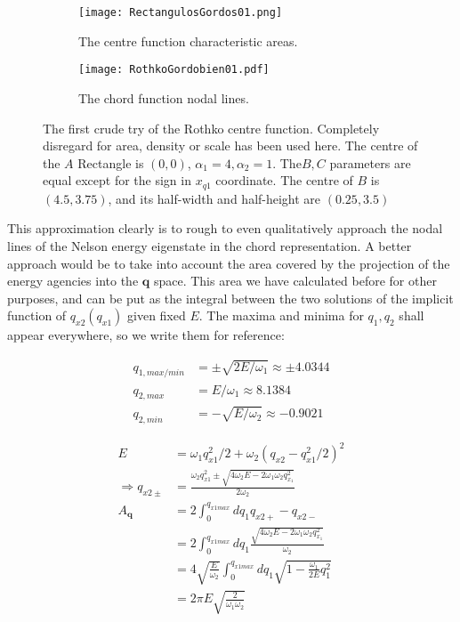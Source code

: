 \documentclass[a4paper,12pt]{article}
\newcommand{\qfase}{\mathbf{q}}
\begin{document}
\begin{figure}[H]
  \centering
  \begin{subfigure}[b]{0.45\textwidth}
    \centering
          \texttt{[image: RectangulosGordos01.png]}
                \caption{The centre function characteristic areas.}
                \label{FabZeros}
  \end{subfigure}%
\begin{subfigure}[b]{0.45\textwidth}
    \centering
          \texttt{[image: RothkoGordobien01.pdf]}
                \caption{The chord function nodal lines.}
                \label{KarelZeros}
  \end{subfigure}%
\caption{The first crude try of the Rothko centre function. Completely disregard
for area, density or scale has been used here.
The centre of the  $A$ Rectangle is $(0,0)$, $\alpha_1=4, \alpha_2=1$.
The$B,C$ parameters are equal except for the sign in $x_{q1}$ coordinate.
The centre of $B$ is $(4.5, 3.75)$, and its half-width and half-height are
$(0.25,3.5)$}
\label{RectangulosGordos}
\end{figure}

This approximation clearly is to rough to even qualitatively approach
the nodal lines of the Nelson energy eigenstate in the chord representation. 
A better approach would be to take into account the area covered by the projection
of the energy agencies into the $\qfase$ space. This area we have calculated before
for other purposes, and can be put as the integral between the two solutions of
the implicit function of $q_{x2}(q_{x1})$ given fixed $E$.
The maxima and minima for $q_1, q_2$ shall appear everywhere, so we write them
for reference:

\begin{align}
q_{1,max/min} & =\pm \sqrt{2E/\omega_1} \approx \pm 4.0344\\
q_{2,max} & = E/\omega_1 \approx 8.1384\\ 
q_{2,min} & = -\sqrt{E/\omega_2} \approx -0.9021
\end{align}


\begin{align}
E &=\omega_1 q_{x1}^2/2+\omega_2 (q_{x2}- q_{x1}^2/2)^2\\
\Rightarrow q_{x2\pm} & = \frac{\omega_2 q_{x1}^2\pm \sqrt{4 \omega_2 E -2 \omega_1\omega_2 q_{x_1}^2}} 
{2\omega_2 } \\
A_\qfase & =2 \int_{0}^{q_{x1max}} d q_1  q_{x2+}-q_{x2-} \\
& = 2 \int_{0}^{q_{x1max}} d q_1  \frac{\sqrt{4 \omega_2 E -2 \omega_1\omega_2 q_{x_1}^2}} {\omega_2} \\
&=  4 \sqrt{\frac{ E} {\omega_2}} \int_{0}^{q_{x1max}} d q_1 
\sqrt{1-\frac{\omega_1}{2E} q_1^2 } \\
&= 2\pi  E\sqrt{\frac{2}{\omega_1\omega_2} }
\end{align}
\end{document}
